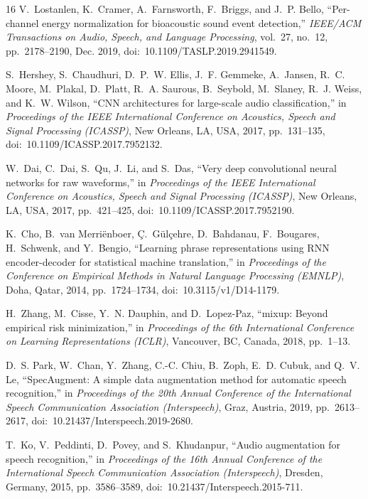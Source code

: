 \documentclass[conference]{IEEEtran}
\begin{document}
\begin{thebibliography}{16}
V.~Lostanlen, K.~Cramer, A.~Farnsworth, F.~Briggs, and J.~P. Bello, ``Per-channel energy normalization for bioacoustic sound event detection,'' \emph{IEEE/ACM Transactions on Audio, Speech, and Language Processing}, vol.~27, no.~12, pp.~2178--2190, Dec. 2019, doi:~10.1109/TASLP.2019.2941549.

S.~Hershey, S.~Chaudhuri, D.~P.~W. Ellis, J.~F. Gemmeke, A.~Jansen, R.~C. Moore, M.~Plakal, D.~Platt, R.~A. Saurous, B.~Seybold, M.~Slaney, R.~J. Weiss, and K.~W. Wilson, ``CNN architectures for large-scale audio classification,'' in \emph{Proceedings of the IEEE International Conference on Acoustics, Speech and Signal Processing (ICASSP)}, New Orleans, LA, USA, 2017, pp.~131--135, doi:~10.1109/ICASSP.2017.7952132.

W.~Dai, C.~Dai, S.~Qu, J.~Li, and S.~Das, ``Very deep convolutional neural networks for raw waveforms,'' in \emph{Proceedings of the IEEE International Conference on Acoustics, Speech and Signal Processing (ICASSP)}, New Orleans, LA, USA, 2017, pp.~421--425, doi:~10.1109/ICASSP.2017.7952190.

K.~Cho, B.~van Merri{\"e}nboer, {\c{C}}.~G{\"u}l{\c{c}}ehre, D.~Bahdanau, F.~Bougares, H.~Schwenk, and Y.~Bengio, ``Learning phrase representations using RNN encoder-decoder for statistical machine translation,'' in \emph{Proceedings of the Conference on Empirical Methods in Natural Language Processing (EMNLP)}, Doha, Qatar, 2014, pp.~1724--1734, doi:~10.3115/v1/D14-1179.

H.~Zhang, M.~Cisse, Y.~N. Dauphin, and D.~Lopez-Paz, ``mixup: Beyond empirical risk minimization,'' in \emph{Proceedings of the 6th International Conference on Learning Representations (ICLR)}, Vancouver, BC, Canada, 2018, pp.~1--13.

D.~S. Park, W.~Chan, Y.~Zhang, C.-C. Chiu, B.~Zoph, E.~D. Cubuk, and Q.~V. Le, ``SpecAugment: A simple data augmentation method for automatic speech recognition,'' in \emph{Proceedings of the 20th Annual Conference of the International Speech Communication Association (Interspeech)}, Graz, Austria, 2019, pp.~2613--2617, doi:~10.21437/Interspeech.2019-2680.

T.~Ko, V.~Peddinti, D.~Povey, and S.~Khudanpur, ``Audio augmentation for speech recognition,'' in \emph{Proceedings of the 16th Annual Conference of the International Speech Communication Association (Interspeech)}, Dresden, Germany, 2015, pp.~3586--3589, doi:~10.21437/Interspeech.2015-711.


\end{thebibliography}
\end{document}
